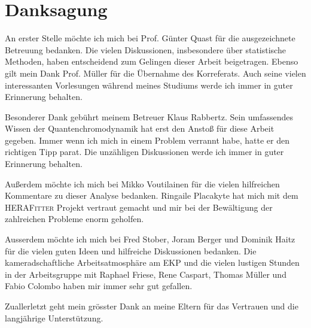 \chapter*{Danksagung}

An erster Stelle möchte ich mich bei Prof. Günter Quast für die ausgezeichnete
Betreuung bedanken. Die vielen Diskussionen, insbesondere über statistische
Methoden, haben entscheidend zum Gelingen dieser Arbeit beigetragen. Ebenso gilt
mein Dank Prof. Müller für die Übernahme des Korreferats. Auch seine vielen
interessanten Vorlesungen während meines Studiums werde ich immer in guter Erinnerung
behalten.

Besonderer Dank gebührt meinem Betreuer Klaus Rabbertz. Sein umfassendes Wissen der
Quantenchromodynamik hat erst den Anstoß für diese Arbeit gegeben. Immer wenn ich mich
in einem Problem verrannt habe, hatte er den richtigen Tipp parat. Die unzähligen Diskussionen werde ich
immer in guter Erinnerung behalten. 

Außerdem möchte ich mich bei Mikko Voutilainen für die vielen hilfreichen
Kommentare zu dieser Analyse bedanken. Ringaile Placakyte hat mich mit dem \textsc{HERAFitter} Projekt vertraut gemacht und
mir bei der Bewältigung der zahlreichen Probleme enorm geholfen. 

Ausserdem möchte ich mich bei Fred Stober, Joram Berger und Dominik Haitz für
die vielen guten Ideen und hilfreiche Diskussionen bedanken. Die
kameradschaftliche Arbeitsatmosphäre am EKP und die vielen lustigen Stunden in
der Arbeitsgruppe mit Raphael Friese, Rene Caspart, Thomas Müller und Fabio
Colombo haben mir immer sehr gut gefallen. 

Zuallerletzt geht mein grösster Dank an meine Eltern für das Vertrauen und die
langjährige Unterstützung.

\cleardoublepage %
